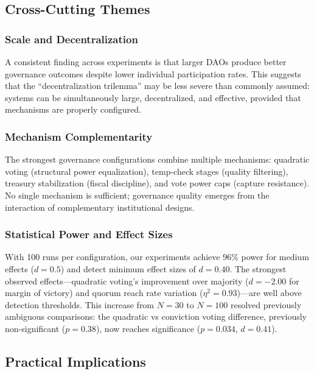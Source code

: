\subsection{Cross-Cutting Themes}

\subsubsection{Scale and Decentralization}

A consistent finding across experiments is that larger DAOs produce better governance outcomes despite lower individual participation rates. This suggests that the ``decentralization trilemma'' may be less severe than commonly assumed: systems can be simultaneously large, decentralized, and effective, provided that mechanisms are properly configured.

\subsubsection{Mechanism Complementarity}

The strongest governance configurations combine multiple mechanisms: quadratic voting (structural power equalization), temp-check stages (quality filtering), treasury stabilization (fiscal discipline), and vote power caps (capture resistance). No single mechanism is sufficient; governance quality emerges from the interaction of complementary institutional designs.

\subsubsection{Statistical Power and Effect Sizes}

With 100 runs per configuration, our experiments achieve $96\%$ power for medium effects ($d = 0.5$) and detect minimum effect sizes of $d = 0.40$. The strongest observed effects---quadratic voting's improvement over majority ($d = -2.00$ for margin of victory) and quorum reach rate variation ($\eta^2 = 0.93$)---are well above detection thresholds. This increase from $N=30$ to $N=100$ resolved previously ambiguous comparisons: the quadratic vs conviction voting difference, previously non-significant ($p = 0.38$), now reaches significance ($p = 0.034$, $d = 0.41$).

\subsection{Practical Implications}

